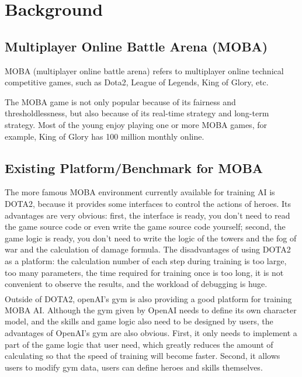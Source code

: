 \documentclass[runningheads]{llncs}
\newcommand{\upcite}[1]{\textsuperscript{\textsuperscript{\cite{#1}}}}
\begin{document}


\section{Background}

\subsection{Multiplayer Online Battle Arena (MOBA)}
\qquad MOBA (multiplayer online battle arena) refers to multiplayer online technical competitive games, such as Dota2, League of Legends, King of Glory, etc.

The MOBA game is not only popular because of its fairness and thresholdlessness, but also because of its real-time strategy and long-term strategy. Most of the young enjoy playing one or more MOBA games, for example, King of Glory has 100 million monthly online.

\subsection{Existing Platform/Benchmark for MOBA}
\qquad The more famous MOBA environment currently available for training AI is DOTA2, because it provides some interfaces to control the actions of heroes. Its advantages are very obvious: first, the interface is ready, you don't need to read the game source code or even write the game source code yourself; second, the game logic is ready, you don't need to write the logic of the towers and the fog of war and the calculation of damage formula. The disadvantages of using DOTA2 as a platform: the calculation number of each step during training is too large, too many parameters, the time required for training once is too long, it is not convenient to observe the results, and the workload of debugging is huge.\\

Outside of DOTA2, openAI's gym \upcite{1606.01540} is also providing a good platform for training MOBA AI. Although the gym given by OpenAI needs to define its own character model, and the skills and game logic also need to be designed by users, the advantages of OpenAI's gym are also obvious. First, it only needs to implement a part of the game logic that user need, which greatly reduces the amount of calculating so that the speed of training will become faster. Second, it allows users to modify gym data, users can define heroes and skills themselves.
\end{document}

